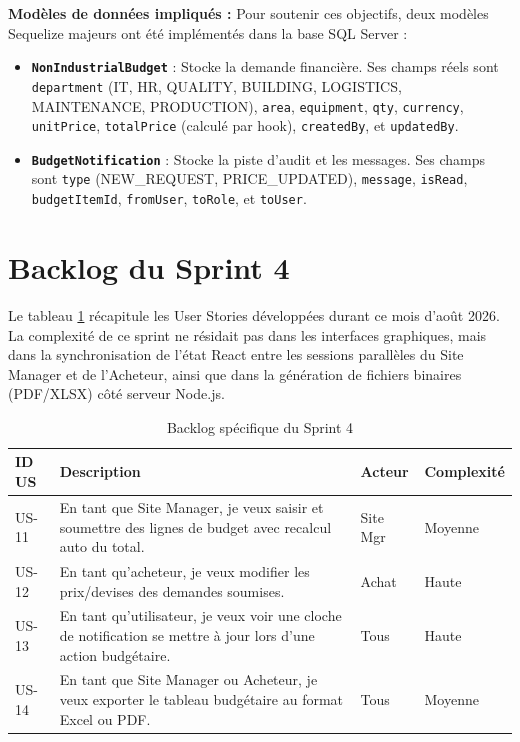 \textbf{Modèles de données impliqués :}
Pour soutenir ces objectifs, deux modèles Sequelize majeurs ont été implémentés dans la base SQL Server :
\begin{itemize}
    \item \textbf{\texttt{NonIndustrialBudget}} : Stocke la demande financière. Ses champs réels sont \texttt{department} (IT, HR, QUALITY, BUILDING, LOGISTICS, MAINTENANCE, PRODUCTION), \texttt{area}, \texttt{equipment}, \texttt{qty}, \texttt{currency}, \texttt{unitPrice}, \texttt{totalPrice} (calculé par hook), \texttt{createdBy}, et \texttt{updatedBy}.
    \item \textbf{\texttt{BudgetNotification}} : Stocke la piste d'audit et les messages. Ses champs sont \texttt{type} (NEW\_REQUEST, PRICE\_UPDATED), \texttt{message}, \texttt{isRead}, \texttt{budgetItemId}, \texttt{fromUser}, \texttt{toRole}, et \texttt{toUser}.
\end{itemize}

\section{Backlog du Sprint 4}
Le tableau \ref{tab:backlog_sprint4} récapitule les User Stories développées durant ce mois d'août 2026. La complexité de ce sprint ne résidait pas dans les interfaces graphiques, mais dans la synchronisation de l'état React entre les sessions parallèles du Site Manager et de l'Acheteur, ainsi que dans la génération de fichiers binaires (PDF/XLSX) côté serveur Node.js.

\begin{table}[h]
\centering
\begin{tabular}{|p{2cm}|p{8cm}|p{2cm}|p{2cm}|}
\hline
\textbf{ID US} & \textbf{Description} & \textbf{Acteur} & \textbf{Complexité} \\ \hline
US-11 & En tant que Site Manager, je veux saisir et soumettre des lignes de budget avec recalcul auto du total. & Site Mgr & Moyenne \\ \hline
US-12 & En tant qu'acheteur, je veux modifier les prix/devises des demandes soumises. & Achat & Haute \\ \hline
US-13 & En tant qu'utilisateur, je veux voir une cloche de notification se mettre à jour lors d'une action budgétaire. & Tous & Haute \\ \hline
US-14 & En tant que Site Manager ou Acheteur, je veux exporter le tableau budgétaire au format Excel ou PDF. & Tous & Moyenne \\ \hline
\end{tabular}
\caption{Backlog spécifique du Sprint 4}
\label{tab:backlog_sprint4}
\end{table}

